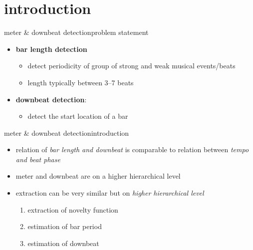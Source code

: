     \section[intro]{introduction}
        \begin{frame}{meter \& downbeat detection}{problem statement}
            \begin{itemize}
                \item \textbf{bar length detection}
                    \begin{itemize}
                        \item   detect periodicity of group of strong and weak musical events/beats
                        \item   length typically between 3--7 beats
                    \end{itemize}
                \bigskip
                \item   \textbf{downbeat detection}:
                    \begin{itemize}
                        \item   detect the start location of a bar
                    \end{itemize}
            \end{itemize}
        \end{frame}
        
            \begin{frame}{meter \& downbeat detection}{introduction}
                \begin{itemize}
                    \item   relation of \textit{bar length and downbeat} is comparable to relation between \textit{tempo and beat phase}
                    \item   meter and downbeat are on a higher hierarchical level
                    \bigskip
                    \item<2-> extraction can be very similar but on \textit{higher hierarchical level}
                        \begin{enumerate}
                            \item   extraction of novelty function
                            \item   estimation of bar period
                            \item   estimation of downbeat
                        \end{enumerate}
                \end{itemize}
            \end{frame}

